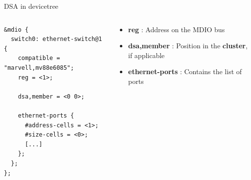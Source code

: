 \begin{frame}[fragile]{DSA in devicetree}
	\begin{columns}
		\begin{column}{0.6\textwidth}
			\begin{block}{}
\begin{verbatim}
&mdio {
  switch0: ethernet-switch@1 {
    compatible = "marvell,mv88e6085";
    reg = <1>;
  
    dsa,member = <0 0>;
  
    ethernet-ports {
      #address-cells = <1>;
      #size-cells = <0>;
      [...]
    };
  };
};
\end{verbatim}
			\end{block}
		\end{column}
		\begin{column}{0.4\textwidth}
			\begin{itemize}
				\item \textbf{reg} : Address on the MDIO bus
				\item \textbf{dsa,member} : Position in the \textbf{cluster}, if applicable
				\item \textbf{ethernet-ports} : Contains the list of ports
			\end{itemize}
		\end{column}
	\end{columns}
\end{frame}

